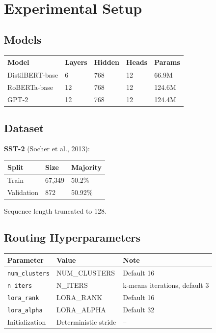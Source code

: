 
\section{Experimental Setup}

\subsection{Models}

\begin{table}[H]
\centering
\small
\begin{tabular}{lllll}
\toprule
\textbf{Model} & \textbf{Layers} & \textbf{Hidden} & \textbf{Heads} & \textbf{Params} \\
\midrule
DistilBERT-base & 6 & 768 & 12 & 66.9M \\
RoBERTa-base & 12 & 768 & 12 & 124.6M \\
GPT-2 & 12 & 768 & 12 & 124.4M \\
\bottomrule
\end{tabular}
\end{table}

\subsection{Dataset}

\textbf{SST-2} (Socher et al., 2013):

\begin{table}[H]
\centering
\small
\begin{tabular}{lll}
\toprule
\textbf{Split} & \textbf{Size} & \textbf{Majority} \\
\midrule
Train & 67,349 & 50.2\% \\
Validation & 872 & 50.92\% \\
\bottomrule
\end{tabular}
\end{table}

Sequence length truncated to 128.

\subsection{Routing Hyperparameters}

\begin{table}[H]
\centering
\small
\begin{tabular}{lll}
\toprule
\textbf{Parameter} & \textbf{Value} & \textbf{Note} \\
\midrule
\texttt{num\_clusters} & {{NUM\_CLUSTERS}} & Default 16 \\
\texttt{n\_iters} & {{N\_ITERS}} & k-means iterations, default 3 \\
\texttt{lora\_rank} & {{LORA\_RANK}} & Default 16 \\
\texttt{lora\_alpha} & {{LORA\_ALPHA}} & Default 32 \\
Initialization & Deterministic stride & -- \\
\bottomrule
\end{tabular}
\end{table}


